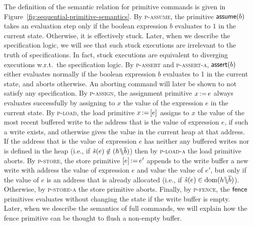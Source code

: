 \documentclass[11pt]{report}
\begin{document}
The definition of the semantic relation for primitive commands is given in Figure~\ref{fig:sequential-primitive-semantics}. By \textsc{p-assume}, the primitive $\operatorname{\mathsf{assume}}(b)$ takes an evaluation step only if the boolean expression $b$ evaluates to $1$ in the current state. Otherwise, it is effectively stuck. Later, when we describe the specification logic, we will see that such stuck executions are irrelevant to the truth of specifications. In fact, stuck executions are equivalent to diverging executions w.r.t.\ the specification logic. By \textsc{p-assert} and \textsc{p-assert-a}, $\operatorname{\mathsf{assert}}(b)$ either evaluates normally if the boolean expression $b$ evaluates to 1 in the current state, and aborts otherwise. An aborting command will later be shown to not satisfy any specification. By \textsc{p-assign}, the assignment primitive $x \operatorname{:\!=} e$ always evaluates successfully by assigning to $x$ the value of the expression $e$ in the current state. By \textsc{p-load}, the load primitive $x \operatorname{:\!=} \left[ e \right]$ assigns to $x$ the value of the most recent buffered write to the address that is the value of expression $e$, if such a write exists, and otherwise gives the value in the current heap at that address. If the address that is the value of expression $e$ has neither any buffered writes nor is defined in the heap (i.e., if $\hat{s}(e) \notin (h \backslash\!\!\backslash \overline{b})$) then by \textsc{p-load-a} the load primitive aborts. By \textsc{p-store}, the store primitive $\left[ e \right] \operatorname{:\!=} e'$ appends to the write buffer a new write with address the value of expression $e$ and value the value of $e'$, but only if the value of $e$ is an address that is already allocated (i.e., if $\hat{s}(e) \in \operatorname{\mathrm{dom}}(h \backslash\!\!\backslash \overline{b})$). Otherwise, by \textsc{p-store-a} the store primitive aborts. Finally, by \textsc{p-fence}, the $\operatorname{\mathsf{fence}}$ primitives evaluates without changing the state if the write buffer is empty. Later, when we describe the semantics of full commands, we will explain how the fence primitive can be thought to flush a non-empty buffer. 
\end{document}
